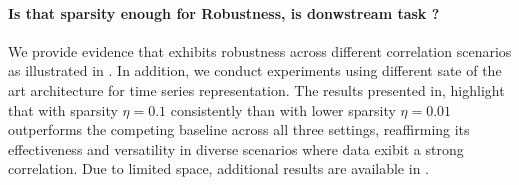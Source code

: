 \documentclass{article} %
\theoremstyle{plain}
\theoremstyle{definition}
\theoremstyle{remark}
\newcommand{\first}{\bf \cellcolor{gray!25}}
\numberwithin{equation}{section}
\begin{document}
\vspace{-0.3cm}
\paragraph{\bf Is that sparsity enough for Robustness, is donwstream task ?}
We provide evidence that \TimeCSL exhibits robustness across different correlation scenarios as illustrated in . In addition, we conduct experiments using different sate of the art architecture for time series representation. The results presented in, highlight that \TimeCSL  with sparsity $\eta=0.1$ consistently than \TimeCSL  with lower sparsity $\eta=0.01$ outperforms the competing baseline across all three settings, reaffirming its effectiveness and versatility in diverse scenarios where data exibit a strong correlation. Due to limited space, additional results are available in .
\end{document}
